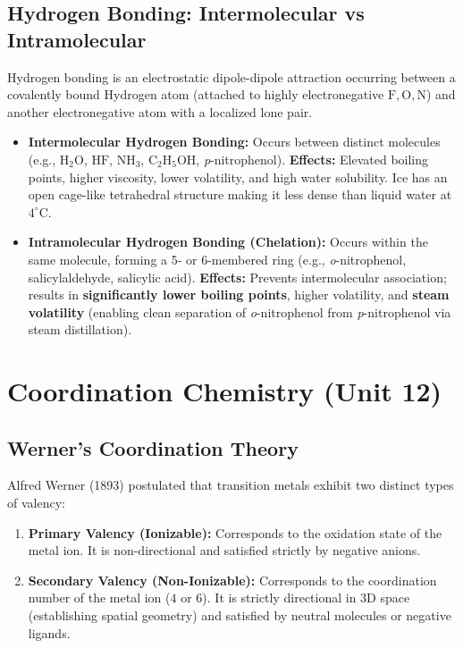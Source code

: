 \documentclass[10pt,twoside,openright]{book}
\begin{document}
\subsection{Hydrogen Bonding: Intermolecular vs Intramolecular}
Hydrogen bonding is an electrostatic dipole-dipole attraction occurring between a covalently bound Hydrogen atom (attached to highly electronegative $\mathrm{F, O, N}$) and another electronegative atom with a localized lone pair.
\begin{itemize}
  \item \textbf{Intermolecular Hydrogen Bonding:} Occurs between distinct molecules (e.g., $\mathrm{H_2O}$, $\mathrm{HF}$, $\mathrm{NH_3}$, $\mathrm{C_2H_5OH}$, \textit{p}-nitrophenol).
  \textbf{Effects:} Elevated boiling points, higher viscosity, lower volatility, and high water solubility. Ice has an open cage-like tetrahedral structure making it less dense than liquid water at $4^\circ\text{C}$.
  \item \textbf{Intramolecular Hydrogen Bonding (Chelation):} Occurs within the same molecule, forming a 5- or 6-membered ring (e.g., \textit{o}-nitrophenol, salicylaldehyde, salicylic acid).
  \textbf{Effects:} Prevents intermolecular association; results in \textbf{significantly lower boiling points}, higher volatility, and \textbf{steam volatility} (enabling clean separation of \textit{o}-nitrophenol from \textit{p}-nitrophenol via steam distillation).
\end{itemize}

\section{Coordination Chemistry (Unit 12)}

\subsection{Werner's Coordination Theory}
Alfred Werner (1893) postulated that transition metals exhibit two distinct types of valency:
\begin{enumerate}
  \item \textbf{Primary Valency (Ionizable):} Corresponds to the oxidation state of the metal ion. It is non-directional and satisfied strictly by negative anions.
  \item \textbf{Secondary Valency (Non-Ionizable):} Corresponds to the coordination number of the metal ion ($4$ or $6$). It is strictly directional in 3D space (establishing spatial geometry) and satisfied by neutral molecules or negative ligands.
\end{enumerate}
\end{document}
